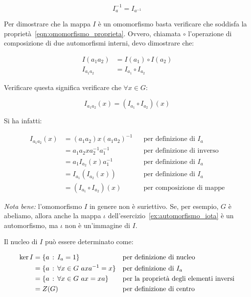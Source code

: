 \begin{soluzione}
	\begin{equation}
		I_a^{-1} = I_{a^{-1}}
	\end{equation}

	Per dimostrare che la mappa $I$ è un omomorfismo basta verificare che soddisfa la proprietà~\eqref{eqn:omomorfismo_proprieta}. Ovvero, chiamata $\circ$ l'operazione di composizione di due automorfismi interni, devo dimostrare che:
	
	\begin{align}
		I(a_1a_2) &= I(a_1) \circ I(a_2) \\
		I_{a_1a_2} &= I_{a_1} \circ I_{a_2}
	\end{align}

	Verificare questa significa verificare che $\forall x \in G$:
	
	\begin{equation}
		I_{a_1a_2}(x) = (I_{a_1} \circ I_{a_2})(x)
	\end{equation}
	
	Si ha infatti:
	
	\begin{align}
		I_{a_1a_2}(x) &= (a_1a_2)x(a_1a_2)^{-1} && \text{per definizione di $I_a$} \\
		&= a_1a_2xa_2^{-1}a_1^{-1} && \text{per definizione di inverso} \\
		&= a_1 I_{a_2}(x) a_1^{-1} && \text{per definizione di $I_a$} \\
		&= I_{a_1}(I_{a_2}(x)) && \text{per definizione di $I_a$} \\
		&= (I_{a_1} \circ I_{a_2})(x) && \text{per composizione di mappe}
	\end{align}

	\emph{Nota bene: } l'omomorfismo $I$ in genere non è suriettivo. Se, per esempio, $G$ è abeliamo, allora anche la mappa $\iota$ dell'esercizio~\ref{ex:automorfismo_iota} è un automorfismo, ma $\iota$ non è un'immagine di $I$.
	
	Il nucleo di $I$ può essere determinato come:
	
	\begin{align}
		\ker I &= \{a \,:\, I_a = 1\} && \text{per definizione di nucleo} \\
		&= \{a \,:\, \forall x \in G\,\,  axa^{-1} = x \} && \text{per definizione di $I_a$} \\
		&= \{a \,:\, \forall x \in G\,\, ax = xa \} && \text{per la proprietà degli elementi inversi} \\
		&= Z(G) && \text{per definizione di centro}
	\end{align}
	

\end{soluzione}
